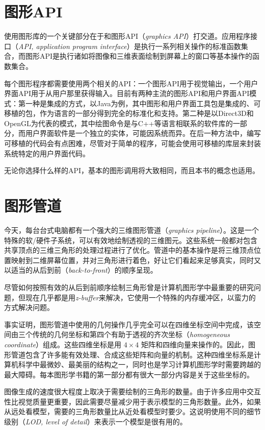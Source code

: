 \documentclass[lang=cn,12pt]{elegantbook}
\begin{document}
\section{图形API}

使用图形库的一个关键部分在于和图形API（\textit{graphics API}）打交道。应用程序接口（\textit{API, application program interface}）是执行一系列相关操作的标准函数集合，而图形API是执行诸如将图像和三维表面绘制到屏幕上的窗口等基本操作的函数集合。

每个图形程序都需要使用两个相关的API：一个图形API用于视觉输出，一个用户界面API用于从用户那里获得输入。目前有两种主流的图形API和用户界面API模式：第一种是集成的方式，以Java为例，其中图形和用户界面工具包是集成的、可移植的包，作为语言的一部分得到完全的标准化和支持。第二种是以Direct3D和OpenGL为代表的模式，其中绘图命令是与C++等语言相联系的软件库的一部分，而用户界面软件是一个独立的实体，可能因系统而异。在后一种方法中，编写可移植的代码会有点困难，尽管对于简单的程序，可能会使用可移植的库层来封装系统特定的用户界面代码。

无论你选择什么样的API，基本的图形调用将大致相同，而且本书的概念也适用。

\section{图形管道}

今天，每台台式电脑都有一个强大的三维图形管道（\textit{graphics pipeline}）。这是一个特殊的软/硬件子系统，可以有效地绘制透视的三维图元。这些系统一般都对包含共享顶点的三维三角形的处理过程进行了优化。管道中的基本操作是将三维顶点位置映射到二维屏幕位置，并对三角形进行着色，好让它们看起来足够真实，同时又以适当的从后到前（\textit{back-to-front}）的顺序呈现。

尽管如何按照有效的从后到前顺序绘制三角形曾是计算机图形学中最重要的研究问题，但现在几乎都是用\textit{z-buffer}来解决，它使用一个特殊的内存缓冲区，以蛮力的方式解决问题。

事实证明，图形管道中使用的几何操作几乎完全可以在四维坐标空间中完成，该空间由三个传统的几何坐标和第四个有助于透视的齐次坐标（\textit{homogeneous coordinate}）组成。这些四维坐标是用 $4 \times 4$ 矩阵和四维向量来操作的。因此，图形管道包含了许多能有效处理、合成这些矩阵和向量的机制。这种四维坐标系是计算机科学中最微妙、最美丽的结构之一，同时也是学习计算机图形学时需要跨越的最大障碍。每本图形学书籍的第一部分都有很大一部分内容是关于这些坐标的。

图像生成的速度很大程度上取决于需要绘制的三角形的数量。由于许多应用中交互性比视觉质量更重要，因此需要尽量减少用于表示模型的三角形数量。此外，如果从远处看模型，需要的三角形数量比从近处看模型时要少。这说明使用不同的细节级别（\textit{LOD, level of detail}）来表示一个模型是很有用的。
\end{document}
